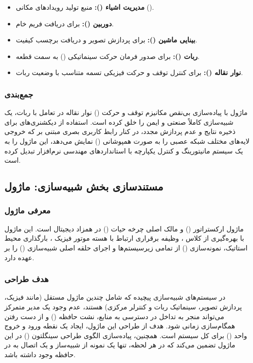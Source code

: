 \documentclass{article}
\begin{document}
\begin{itemize}
	\item \textbf{مدیریت اشیاء ():} منبع تولید رویدادهای مکانی ().
	\item \textbf{دوربین ():} برای دریافت فریم خام.
	\item \textbf{بینایی ماشین ():} برای پردازش تصویر و دریافت برچسب کیفیت.
	\item \textbf{ربات ():} برای صدور فرمان حرکت سینماتیکی () به سمت قطعه.
	\item \textbf{نوار نقاله ():} برای کنترل توقف و حرکت فیزیکی تسمه متناسب با وضعیت ربات.
\end{itemize}

\subsubsection{جمع‌بندی}
ماژول  با پیاده‌سازی بی‌نقص مکانیزم توقف و حرکت () نوار نقاله در تعامل با ربات، یک شبیه‌سازی کاملاً صنعتی و ایمن را خلق کرده است. استفاده از دیکشنری‌های  برای ذخیره نتایج و عدم پردازش مجدد، در کنار رابط کاربری بصری مبتنی بر  که خروجی لایه‌های مختلف شبکه عصبی را به صورت همپوشانی () نمایش می‌دهد، این ماژول را به یک سیستم مانیتورینگ و کنترل یکپارچه با استانداردهای مهندسی نرم‌افزار تبدیل کرده است.

\subsection{مستندسازی بخش شبیه‌سازی: ماژول }

\subsubsection{معرفی ماژول}
ماژول  ارکستراتور () و مالک اصلی چرخه حیات () در همزاد دیجیتال است. این ماژول با بهره‌گیری از کلاس ، وظیفه برقراری ارتباط با هسته موتور فیزیک ، بارگذاری محیط استاتیک، نمونه‌سازی () از تمامی زیرسیستم‌ها و اجرای حلقه اصلی شبیه‌سازی () را بر عهده دارد.

\subsubsection{هدف طراحی}
در سیستم‌های شبیه‌سازی پیچیده که شامل چندین ماژول مستقل (مانند فیزیک، پردازش تصویر، سینماتیک ربات و کنترلر مرکزی) هستند، عدم وجود یک مدیر متمرکز می‌تواند منجر به تداخل در دسترسی به منابع، نشت حافظه () و از دست رفتن همگام‌سازی زمانی شود. هدف از طراحی این ماژول، ایجاد یک نقطه ورود و خروج واحد () برای کل سیستم است. همچنین، پیاده‌سازی الگوی طراحی سینگلتون () در این ماژول تضمین می‌کند که در هر لحظه، تنها یک نمونه از شبیه‌ساز و یک اتصال به  در حافظه وجود داشته باشد.
\end{document}
